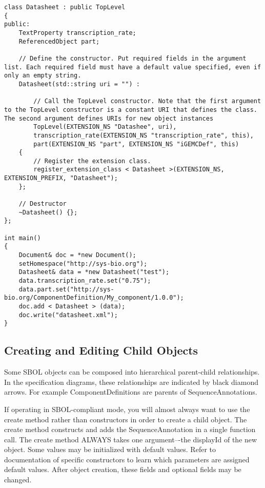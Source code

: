 \vspace{\abovedisplayskip}
\begin{minipage}{0.95\textwidth} 
\begin{lstlisting}
class Datasheet : public TopLevel 
{
public:
    TextProperty transcription_rate;
    ReferencedObject part;

    // Define the constructor. Put required fields in the argument list. Each required field must have a default value specified, even if only an empty string.
    Datasheet(std::string uri = "") :
    
        // Call the TopLevel constructor. Note that the first argument to the TopLevel constructor is a constant URI that defines the class. The second argument defines URIs for new object instances 
        TopLevel(EXTENSION_NS "Datashee", uri),
        transcription_rate(EXTENSION_NS "transcription_rate", this),
        part(EXTENSION_NS "part", EXTENSION_NS "iGEMCDef", this)
    {
        // Register the extension class.
        register_extension_class < Datasheet >(EXTENSION_NS, EXTENSION_PREFIX, "Datasheet");
    };
    
    // Destructor
    ~Datasheet() {};
};

int main()
{
    Document& doc = *new Document();
    setHomespace("http://sys-bio.org");
    Datasheet& data = *new Datasheet("test");
    data.transcription_rate.set("0.75");
    data.part.set("http://sys-bio.org/ComponentDefinition/My_component/1.0.0");
    doc.add < Datasheet > (data);
    doc.write("datasheet.xml");
}
\end{lstlisting}
\end{minipage}

\subsection*{Creating and Editing Child Objects}
Some SBOL objects can be composed into hierarchical parent-child relationships. In the specification diagrams, these relationships are indicated by black diamond arrows. For example ComponentDefinitions are parents of SequenceAnnotations. 

If operating in SBOL-compliant mode, you will almost always want to use the create method rather than constructors in order to create a child object. The create method constructs and adds the SequenceAnnotation in a single function call. The create method ALWAYS takes one argument–-the displayId of the new object. Some values may be initialized with default values. Refer to documentation of specific constructors to learn which parameters are assigned default values. After object creation, these fields and optional fields may be changed. 

